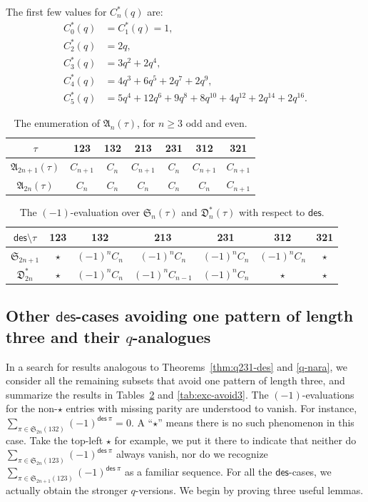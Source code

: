\documentclass[12pt,reqno]{amsart}
\numberwithin{equation}{section}
\theoremstyle{plain}
\theoremstyle{definition}
\def\S{\mathfrak{S}}
\def\D{\mathfrak{D}}
\def\A{\mathfrak{A}}
\def\des{\mathsf{des}}
\begin{document}
The first few values for $C^{*}_n(q)$ are:
\begin{align*}
C^*_0(q) &=C^*_1(q)=1,\\
C^*_2(q) &=2q,\\
C^*_3(q) &=3q^2+2q^4,\\
C^*_4(q) &=4q^3+6q^5+2q^7+2q^9,\\
C^*_5(q) &=5q^4+12q^6+9q^8+8q^{10}+4q^{12}+2q^{14}+2q^{16}.
\end{align*}

\begin{table}[tbp]\caption{The enumeration of $\A_n(\tau)$, for $n\ge 3$ odd and even.}
\label{tab:alt-3}
\centering
\begin{tabular}{ccccccc}
\hline
$\tau$ &123 &132 &213 &231 &312 &321\\
\hline
$\A_{2n+1}(\tau)$ &$C_{n+1}$ &$C_n$ &$C_{n+1}$ &$C_n$ &$C_{n+1}$ &$C_{n+1}$ \\
$\A_{2n}(\tau)$ &$C_{n}$ &$C_n$ &$C_{n}$ &$C_n$ &$C_{n}$ &$C_{n+1}$ \\
\hline
\end{tabular}
\end{table}

\begin{table}[tbp]\caption{The $(-1)$-evaluation over $\S_n(\tau)$ and $\D^*_n(\tau)$ with respect to $\des$.}
\label{tab:avoid-3}
\centering
\begin{tabular}{ccccccc}
\hline
$\des\setminus \tau$ &123 &132 &213 &231 &312 &321\\
\hline
$\S_{2n+1}$ &$\star$ &$(-1)^nC_n$ &$(-1)^nC_n$ &$(-1)^nC_n$ &$(-1)^nC_n$ &$\star$ \\
$\D^*_{2n}$ &$\star$ &$(-1)^nC_n$ &$(-1)^nC_{n-1}$ &$(-1)^nC_n$ &$\star$ &$\star$ \\
\hline
\end{tabular}
\end{table}


\subsection{\texorpdfstring{Other $\des$-cases avoiding one pattern of length three and their $q$-analogues}{}}
In a search for results analogous to Theorems~\ref{thm:q231-des} and \ref{q-nara}, we consider all the remaining subsets that avoid one pattern of length three, and summarize the results in Tables~\ref{tab:avoid-3} and \ref{tab:exc-avoid3}. The $(-1)$-evaluations for the non-$\star$ entries with missing parity are understood to vanish. For instance, $\sum_{\pi\in\S_{2n}(132)}(-1)^{\des\:\pi}=0$. A ``$\star$'' means there is no such phenomenon in this case. Take the top-left $\star$ for example, we put it there to indicate that neither do $\sum_{\pi\in \S_{2n}(123)}(-1)^{\des\:\pi}$ always vanish, nor do we recognize $\sum_{\pi\in \S_{2n+1}(123)}(-1)^{\des\:\pi}$ as a familiar sequence. For all the $\des$-cases, we actually obtain the stronger $q$-versions. We begin by proving three useful lemmas.
\end{document}

